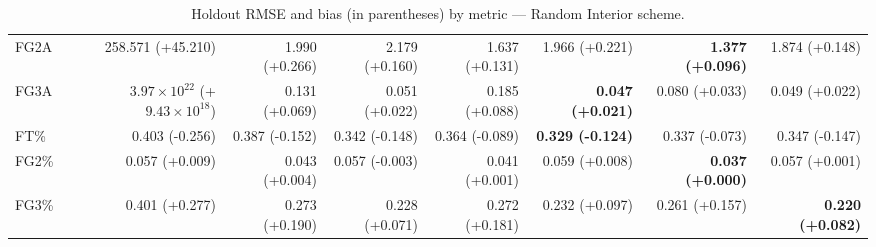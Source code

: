 \begin{table}[H]
{\begin{tabular}{lrrrrrrr}
FG2A & 258.571 (+45.210) & 1.990 (+0.266) & 2.179 (+0.160) & 1.637 (+0.131) & 1.966 (+0.221) & \textbf{1.377 (+0.096)} & 1.874 (+0.148) \\
FG3A & $3.97\times10^{22}$ (+$9.43\times10^{18}$) & 0.131 (+0.069) & 0.051 (+0.022) & 0.185 (+0.088) & \textbf{0.047 (+0.021)} & 0.080 (+0.033) & 0.049 (+0.022) \\
FT\% & 0.403 (-0.256) & 0.387 (-0.152) & 0.342 (-0.148) & 0.364 (-0.089) & \textbf{0.329 (-0.124)} & 0.337 (-0.073) & 0.347 (-0.147) \\
FG2\% & 0.057 (+0.009) & 0.043 (+0.004) & 0.057 (-0.003) & 0.041 (+0.001) & 0.059 (+0.008) & \textbf{0.037 (+0.000)} & 0.057 (+0.001) \\
FG3\% & 0.401 (+0.277) & 0.273 (+0.190) & 0.228 (+0.071) & 0.272 (+0.181) & 0.232 (+0.097) & 0.261 (+0.157) & \textbf{0.220 (+0.082)} \\
\bottomrule
\end{tabular}
}
\caption{Holdout RMSE and bias (in parentheses) by metric — Random Interior scheme.}
\label{tab:coverage_random_interior}
\end{table}

